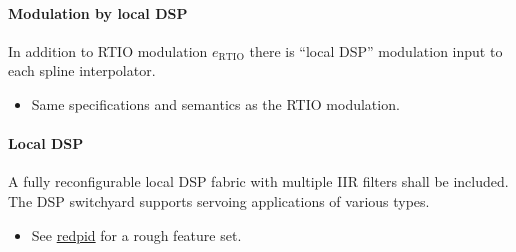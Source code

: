 \documentclass[11pt]{paper}
\begin{document}
\paragraph{Modulation by local DSP}
In addition to RTIO modulation $e_\mathrm{RTIO}$ there is ``local DSP'' modulation
input to each spline interpolator.

\begin{itemize}
	\item Same specifications and semantics as the RTIO modulation.
\end{itemize}

\paragraph{Local DSP}
A fully reconfigurable local DSP fabric with multiple IIR filters shall be
included. The DSP switchyard supports servoing applications of various types.
\begin{itemize}
	\item See \href{https://github.com/jordens/redpid}{redpid} for a rough
		feature set.
\end{itemize}
\end{document}
